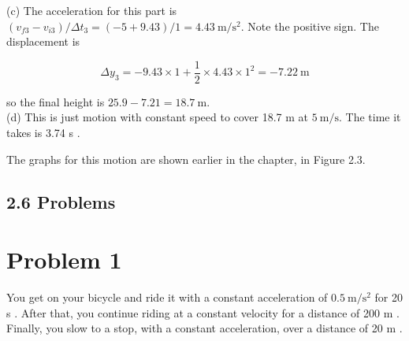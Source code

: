 \documentclass[10pt]{article}
\begin{document}
(c) The acceleration for this part is $\left(v_{f 3}-v_{i 3}\right) / \Delta t_{3}=(-5+9.43) / 1=4.43 \mathrm{~m} / \mathrm{s}^{2}$. Note the positive sign. The displacement is

$$
\Delta y_{3}=-9.43 \times 1+\frac{1}{2} \times 4.43 \times 1^{2}=-7.22 \mathrm{~m}
$$

so the final height is $25.9-7.21=18.7 \mathrm{~m}$.\\
(d) This is just motion with constant speed to cover 18.7 m at $5 \mathrm{~m} / \mathrm{s}$. The time it takes is 3.74 s .

The graphs for this motion are shown earlier in the chapter, in Figure 2.3.

\subsection*{2.6 Problems}
\section*{Problem 1}
You get on your bicycle and ride it with a constant acceleration of $0.5 \mathrm{~m} / \mathrm{s}^{2}$ for 20 s . After that, you continue riding at a constant velocity for a distance of 200 m . Finally, you slow to a stop, with a constant acceleration, over a distance of 20 m .
\end{document}
